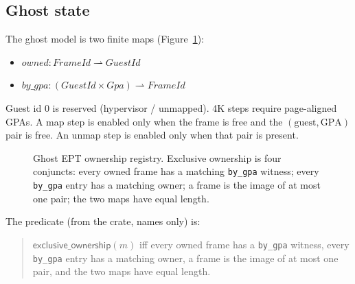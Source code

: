 \documentclass[sigplan,10pt,anonymous]{acmart}
\begin{document}
\subsection{Ghost state}

The ghost model is two finite maps (Figure~\ref{fig:maps}):

\begin{itemize}
\item $\mathit{owned}: \mathit{FrameId} \rightharpoonup \mathit{GuestId}$
\item $\mathit{by\_gpa}: (\mathit{GuestId} \times \mathit{Gpa}) \rightharpoonup \mathit{FrameId}$
\end{itemize}

Guest id $0$ is reserved (hypervisor / unmapped). 4K steps require
page-aligned GPAs. A map step is enabled only when the frame is free and the
$(\mathrm{guest},\mathrm{GPA})$ pair is free. An unmap step is enabled only
when that pair is present.

\begin{figure}[t]
\centering
{}
\caption{Ghost EPT ownership registry. Exclusive ownership is four
conjuncts: every owned frame has a matching \texttt{by\_gpa} witness; every
\texttt{by\_gpa} entry has a matching owner; a frame is the image of at most
one pair; the two maps have equal length.}
\label{fig:maps}
\end{figure}

The predicate (from the crate, names only) is:
\begin{quote}
\footnotesize
$\mathsf{exclusive\_ownership}(m)$ iff
every owned frame has a \texttt{by\_gpa} witness,
every \texttt{by\_gpa} entry has a matching owner,
a frame is the image of at most one pair,
and the two maps have equal length.
\end{quote}
\end{document}
